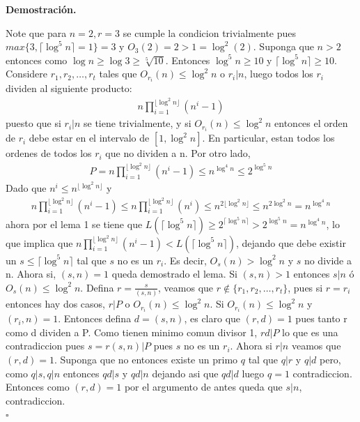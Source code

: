 \documentclass{article}
\newenvironment{dem}{\par\noindent\textbf{Demostración.}\par}{\hfill$\square$\par}
\begin{document}
\begin{dem}
    Note que para $n=2,r=3$ se cumple la condicion trivialmente pues $max\{3,\lceil \log^5 n \rceil =1\} =3$ y $O_3(2)=2>1=\log^2(2)$. Suponga que $n>2$ entonces como $\log n \geq \log 3 \geq \sqrt[5]{10}$.
    Entonces  $\log^5 n \geq 10$ y $\lceil\log^5 n \rceil\ge 10$. Considere $r_1,r_2,\dots,r_t$ tales que $O_{r_i}(n)\leq \log^2 n$ o $r_i|n$, luego todos los $r_i$ dividen al siguiente producto: \\
    \begin{align}
        n\prod_{i=1}^{\lfloor\log^2n\rfloor} (n^i -1)
    \end{align}
    puesto que si $r_i|n$ se tiene trivialmente, y si $O_{r_i}(n)\leq \log^2 n$ entonces el orden de $r_i$ debe estar en el intervalo de $[1,\log^2n]$. En particular, estan todos los ordenes de todos los $r_i$
    que no dividen a n. Por otro lado, 
    \begin{align}
        P=n\prod_{i=1}^{\lfloor\log^2n\rfloor} (n^i -1)\le n^{\log^4n}\leq 2^{\log^5n}
    \end{align}
    Dado que $n^i \leq n^{\lfloor\log^2n\rfloor}$ y 
    \begin{align}
    n\prod_{i=1}^{\lfloor\log^2n\rfloor} (n^i -1)\le n\prod_{i=1}^{\lfloor\log^2n\rfloor} (n^i)\le n^{2\lfloor\log^2n\rfloor} \le n^{2\log^2n} = n^{\log^4n}
    \end{align}
    ahora por el lema 1 se tiene que $L(\lceil\log^5 n\rceil) \geq 2^{\lceil\log^5 n\rceil} > 2^{\log^5 n} = n^{\log^4 n}$, lo que implica que $n\prod_{i=1}^{\lfloor\log^2n\rfloor} (n^i -1) < L(\lceil\log^5 n\rceil)$,
    dejando que debe existir un $s\leq \lceil\log^5 n\rceil$ tal que $s$ no es un $r_i$. Es decir, $O_s(n) > \log^2 n$ y $s$ no divide a n. Ahora si, $(s,n)=1$ queda demostrado el lema.
    Si $(s,n)>1$ entonces $s|n$ ó $O_s(n) \leq \log^2 n$. Defina $r=\frac{s}{(s,n)}$,
    veamos que $r\notin\{r_1,r_2,\dots,r_t\}$, pues si $r=r_i$ entonces hay dos casos, $r|P$ o $O_{r_i}(n)\leq \log^2 n$. 
    Si $O_{r_i}(n)\leq \log^2 n$ y $(r_i,n)=1$. Entonces defina $d=(s,n)$, es claro que $(r,d)=1$ pues tanto r como d dividen a P. Como tienen 
    minimo comun divisor 1, $rd|P$ lo que es una contradiccion pues $s=r(s,n)|P$ pues $s$ no es un $r_i$.
    Ahora si $r|n$ veamos que $(r,d)=1$. Suponga que no entonces existe un primo $q$ tal que $q|r$ y $q|d$ pero, como $q|s,q|n$ entonces $qd|s$ y $qd|n$
    dejando asi que $qd|d$ luego $q=1$ contradiccion. Entonces como $(r,d)=1$ por el argumento de antes queda que $s|n$, contradiccion.\\
\end{dem}
\end{document}
